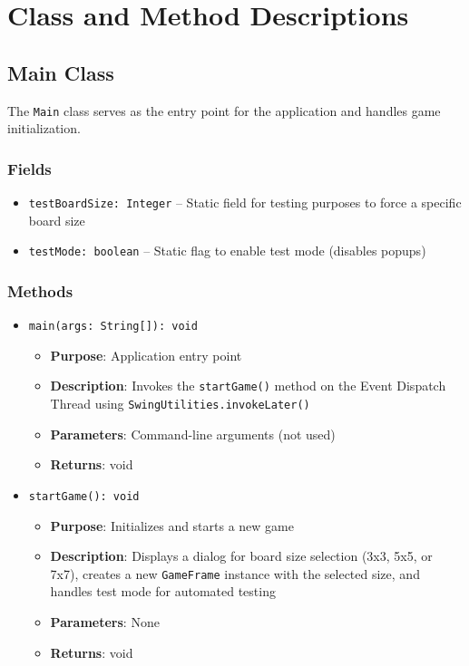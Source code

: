 \documentclass[12pt,a4paper]{article}
\begin{document}
\newpage

\section{Class and Method Descriptions}

\subsection{Main Class}

The \texttt{Main} class serves as the entry point for the application and handles game initialization.

\subsubsection{Fields}
\begin{itemize}
    \item \texttt{testBoardSize: Integer} -- Static field for testing purposes to force a specific board size
    \item \texttt{testMode: boolean} -- Static flag to enable test mode (disables popups)
\end{itemize}

\subsubsection{Methods}

\begin{itemize}
    \item \texttt{main(args: String[]): void}
    \begin{itemize}
        \item \textbf{Purpose}: Application entry point
        \item \textbf{Description}: Invokes the \texttt{startGame()} method on the Event Dispatch Thread using \texttt{SwingUtilities.invokeLater()}
        \item \textbf{Parameters}: Command-line arguments (not used)
        \item \textbf{Returns}: void
    \end{itemize}
    
    \item \texttt{startGame(): void}
    \begin{itemize}
        \item \textbf{Purpose}: Initializes and starts a new game
        \item \textbf{Description}: Displays a dialog for board size selection (3x3, 5x5, or 7x7), creates a new \texttt{GameFrame} instance with the selected size, and handles test mode for automated testing
        \item \textbf{Parameters}: None
        \item \textbf{Returns}: void
    \end{itemize}
\end{itemize}
\end{document}
